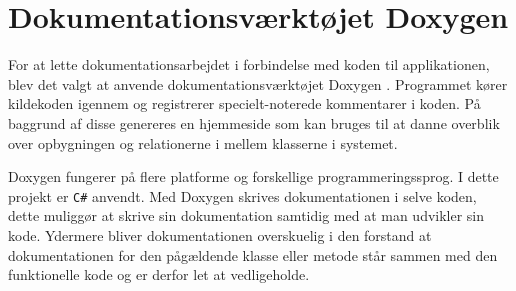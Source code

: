 \section{Dokumentationsværktøjet Doxygen}
For at lette dokumentationsarbejdet i forbindelse med koden til applikationen, blev det valgt at anvende dokumentationsværktøjet Doxygen \citep{doxygenWeb}. Programmet kører kildekoden igennem og registrerer specielt-noterede kommentarer i koden. På baggrund af disse genereres en hjemmeside som kan bruges til at danne overblik over opbygningen og relationerne i mellem klasserne i systemet.

Doxygen fungerer på flere platforme og forskellige programmeringssprog. I dette projekt er \verb+C#+  anvendt. Med Doxygen skrives dokumentationen  i selve koden, dette muliggør at skrive sin dokumentation samtidig med at man udvikler sin kode. Ydermere bliver dokumentationen overskuelig i den forstand at dokumentationen for den pågældende klasse eller metode står sammen med den funktionelle kode og er derfor let at vedligeholde.